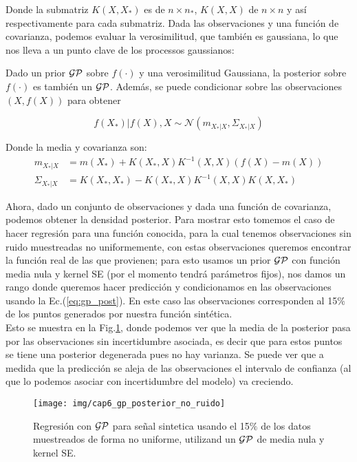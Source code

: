 Donde la submatriz $K(X, X_*)$ es de $n \times n_*$, $K(X, X)$ de $n \times n$ y así respectivamente para cada submatriz. Dada las observaciones y una función de covarianza, podemos evaluar la verosimilitud, que también es gaussiana, lo que nos lleva a un punto clave de los processos gaussianos:

\begin{lemma}
	Dado un prior $\mathcal{GP}$ sobre $f(\cdot)$ y una verosimilitud Gaussiana, la posterior sobre $f(\cdot)$ es también un $\mathcal{GP}$. Además, se puede condicionar sobre las observaciones $(X, f(X))$ para obtener

\begin{equation}
	f(X_*)|f(X), X  \sim \mathcal{N}(m_{X_*|X}, \Sigma_{X_*|X}) \label{eq:gp_post}
\end{equation}

Donde la media y covarianza son:
\begin{align}
	m_{X_*|X} & = m(X_*) + K(X_*, X)K^{-1}(X, X) (f(X) - m(X))\\
	 \Sigma_{X_*|X} & = K(X_*, X_*) - K(X_*, X)K^{-1}(X, X) K(X, X_*)
\end{align}
\end{lemma}

Ahora, dado un conjunto de observaciones y dada una función de covarianza, podemos obtener la densidad posterior. Para mostrar esto tomemos el caso de hacer regresión para una función conocida, para la cual tenemos observaciones sin ruido muestreadas no uniformemente, con estas observaciones queremos encontrar la función real de las que provienen; para esto usamos un prior $\mathcal{GP}$ con función media nula y kernel SE (por el momento tendrá parámetros fijos), nos damos un rango donde queremos hacer predicción y condicionamos en las observaciones usando la Ec.(\ref{eq:gp_post}). En este caso las observaciones corresponden al 15$\%$ de los puntos generados por nuestra función sintética.\\

Esto se muestra en la Fig.\ref{fig:gp_2}, donde podemos ver que la media de la posterior pasa por las observaciones sin incertidumbre asociada, es decir que para estos puntos se tiene una posterior degenerada pues no hay varianza. Se puede ver que a medida que la predicción se aleja de las observaciones el intervalo de confianza (al que lo podemos asociar con incertidumbre del modelo) va creciendo.

\begin{figure}[H]
	\centering
	\texttt{[image: img/cap6\_gp\_posterior\_no\_ruido]}
	\caption{Regresión con $\mathcal{GP}$ para señal sintetica usando el 15$\%$ de los datos muestreados de forma no uniforme, utilizand un $\mathcal{GP}$ de media nula y kernel SE.} 
	\label{fig:gp_2}
\end{figure}

